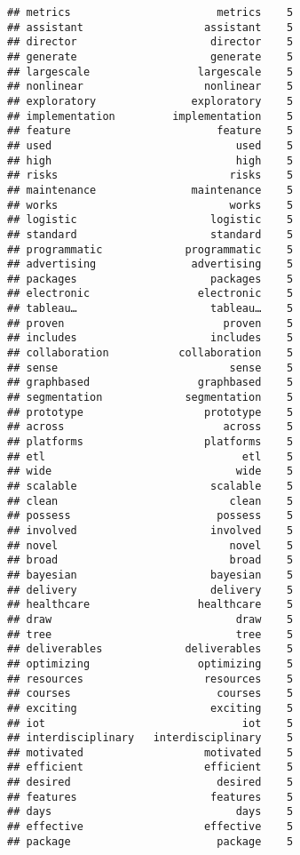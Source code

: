 \documentclass[]{article}
\begin{document}
\begin{verbatim}
## metrics                       metrics    5
## assistant                   assistant    5
## director                     director    5
## generate                     generate    5
## largescale                 largescale    5
## nonlinear                   nonlinear    5
## exploratory               exploratory    5
## implementation         implementation    5
## feature                       feature    5
## used                             used    5
## high                             high    5
## risks                           risks    5
## maintenance               maintenance    5
## works                           works    5
## logistic                     logistic    5
## standard                     standard    5
## programmatic             programmatic    5
## advertising               advertising    5
## packages                     packages    5
## electronic                 electronic    5
## tableau…                     tableau…    5
## proven                         proven    5
## includes                     includes    5
## collaboration           collaboration    5
## sense                           sense    5
## graphbased                 graphbased    5
## segmentation             segmentation    5
## prototype                   prototype    5
## across                         across    5
## platforms                   platforms    5
## etl                               etl    5
## wide                             wide    5
## scalable                     scalable    5
## clean                           clean    5
## possess                       possess    5
## involved                     involved    5
## novel                           novel    5
## broad                           broad    5
## bayesian                     bayesian    5
## delivery                     delivery    5
## healthcare                 healthcare    5
## draw                             draw    5
## tree                             tree    5
## deliverables             deliverables    5
## optimizing                 optimizing    5
## resources                   resources    5
## courses                       courses    5
## exciting                     exciting    5
## iot                               iot    5
## interdisciplinary   interdisciplinary    5
## motivated                   motivated    5
## efficient                   efficient    5
## desired                       desired    5
## features                     features    5
## days                             days    5
## effective                   effective    5
## package                       package    5

\end{verbatim}
\end{document}
